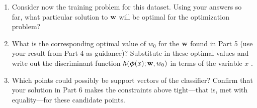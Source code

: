 \documentclass[submit]{harvardml}
\begin{document}
\begin{problem}
\begin{enumerate}
\item Consider now the training problem for this dataset. Using your
  answers so far, what particular solution to $\mathbf{w}$ will be optimal
  for the optimization problem?

\item What is the corresponding optimal value of $w_0$ for the
  $\mathbf{w}$ found in Part 5 (use your result from Part 4 as guidance)?
  Substitute in these optimal values and write out the discriminant
  function $h(\boldsymbol{\phi}(x);\mathbf{w},w_0)$ in terms of the variable $x$ .


\item Which points could possibly be support vectors of the classifier?  Confirm that
  your solution in Part 6 makes the constraints above tight---that is,
  met with equality---for these candidate points.

\end{enumerate}

\end{problem}


\newpage
\end{document}
